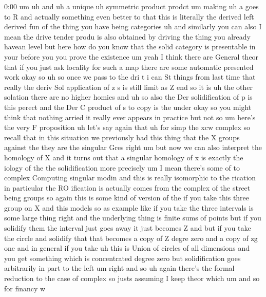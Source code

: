\begin{unfinished}{0:00}
um  uh  and  uh  a
unique
uh  symmetric
product  prodct
um
making  uh  a  goes  to
R  and  actually  something  even  better  to
that  this  is  literally  the  derived  left
derived  fun  of  the  thing  you  have  being
categories  uh  and  similarly  you  can  also
I  mean  the  drive  tender  produ  is  also
obtained  by
driving  the  thing  you  already
havean
level  but  here  how  do  you  know  that  the
solid  category  is  presentable  in
your  before  you  you  prove  the
existence
um  yeah  I  think  there  are  General  theor
that  if  you  just  ask  locality  for  such  a
map  there  are  some  automatic  presented
work
okay
so  uh  so  once  we  pass  to  the  dri  t  i  can
St  things  from  last  time  that  really  the
deriv  Sol  application  of  z  s  is  still
limit  as  Z
end  so  it  is  uh  the  other  solation  there
are  no  higher
homies  and  uh  so  also  the  Der
solidification  of  p  is  this
perect
and  the  Der  C  product  of  s  to  copy  is
the
under  okay  so  you  might  think
that  nothing  arried  it  really  ever
appears  in  practice  but  not  so  um  here's
the  very  F
proposition  uh  let's  say  again  that  uh
for  simp  the  xcw
complex
so  recall  that  in  this  situation  we
previously  had  this  thing  that  the  X
groups  against
the  they  are  the  singular
Gres
right
um  but  now  we  can  also  interpret  the
homology  of  X  and  it  turns  out
that  a  singular  homology  of
x  is  exactly  the
iology  of  the  the
solidification  more
precisely  um  I  mean  there's  some  of  to
complex  Computing  singular
modin  and  this  is  really  isomorphic
to  the
rication  in  particular  the  RO  ification
is
actually  comes  from  the  complex  of  the
street  being
groups
so  again  this  is  some  kind  of  version  of
the  if  you
take  this  three  group  on  X  and  this
models  so  as  example  like  if  you  take
the  three  intervals  is  some
large  thing  right  and  the  underlying
thing  is  finite  sums
of  points  but  if  you  solidify  them  the
interval  just  goes  away  it  just  becomes
Z  and  but  if  you  take  the  circle  and
solidify  that  that  becomes  a  copy  of  Z
degre  zero  and  a  copy  of  zg
one  and  in  general  if  you  take  uh
this  is  Union  of  circles  of  all
dimensions  and  you  get  something  which
is  concentrated  degree  zero  but
solidification  goes  arbitrarily  in  part
to  the
left
um  right  and
so  uh  again  there's  the  formal  reduction
to  the  case  of
complex  so  justs
assuming  I  keep
theor
which  um  and  so  for  financy  w

\end{unfinished}
